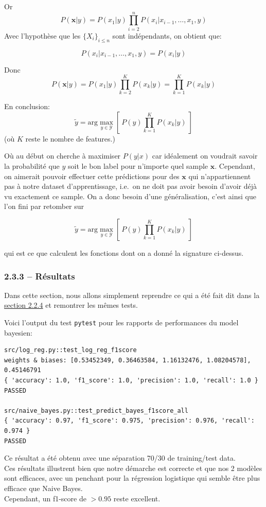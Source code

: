 \documentclass[
]{article}
\begin{document}
Or \[ 
P(\mathbf{x}| y) = P(x_1 | y) \prod_{i = 2}^{n}{P(x_i | x_{i-1}, \ldots, x_1, y)}
\] Avec l'hypothèse que les \(\{X_i\}_{i \leq n}\) sont indépendants, on
obtient que:

\[P(x_i | x_{i-1}, \ldots, x_1, y) = P(x_i | y)\]

Donc
\[P(\mathbf{x}|y) = P(x_1 | y) \prod_{k = 2}^{K}{P(x_k | y)} = \prod_{k=1}^K{P(x_k | y)}\]

En conclusion:
\[ \tilde{y} = \text{arg}\max_{y \in \mathcal{Y}} \left[\  P(y) \prod_{k = 1}^K{P(x_k | y)}\  \right] \]
(où \(K\) reste le nombre de features.)

Où au début on cherche à maximiser \(P(y | x)\) car idéalement on
voudrait savoir la probabilité que \(y\) soit le bon label pour
n'importe quel sample \(\mathbf{x}\). Cependant, on aimerait pouvoir
effectuer cette prédictions pour des \(\mathbf{x}\) qui n'appartiennent
pas à notre dataset d'apprentissage, i.e.~on ne doit pas avoir besoin
d'avoir déjà vu exactement ce sample. On a donc besoin d'une
généralisation, c'est ainsi que l'on fini par retomber sur

\[ \tilde{y} = \text{arg}\max_{y \in \mathcal{Y}} \left[\  P(y) \prod_{k = 1}^K{P(x_k | y)}\  \right] \]

qui est ce que calculent les fonctions dont on a donné la signature
ci-dessus.

\subsubsection{2.3.3 -- Résultats}\label{ruxe9sultats-1}

Dans cette section, nous allons simplement reprendre ce qui a été fait
dit dans la \href{#ruxe9sultats}{section 2.2.4} et remontrer les mêmes
tests.

Voici l'output du test \texttt{pytest} pour les rapports de performances
du model bayesien:

\begin{lstlisting}
src/log_reg.py::test_log_reg_f1score 
weights & biases: [0.53452349, 0.36463584, 1.16132476, 1.08204578], 0.45146791  
{ 'accuracy': 1.0, 'f1_score': 1.0, 'precision': 1.0, 'recall': 1.0 }
PASSED

src/naive_bayes.py::test_predict_bayes_f1score_all  
{ 'accuracy': 0.97, 'f1_score': 0.975, 'precision': 0.976, 'recall': 0.974 }
PASSED
\end{lstlisting}

Ce résultat a été obtenu avec une séparation 70/30 de training/test
data.\\
Ces résultats illustrent bien que notre démarche est correcte et que nos
2 modèles sont efficaces, avec un penchant pour la régression logistique
qui semble être plus efficace que Naive Bayes.\\
Cependant, un f1-score de \(> 0.95\) reste excellent.
\end{document}
